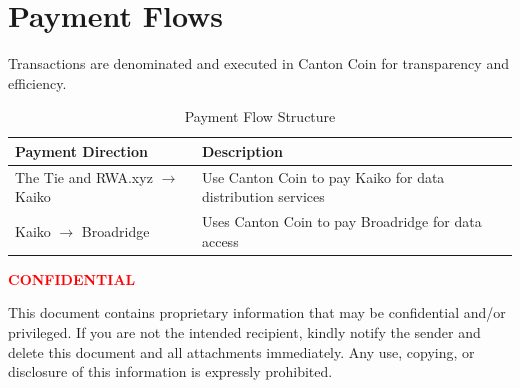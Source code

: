 \documentclass[11pt,a4paper]{article}
\begin{document}
\section{Payment Flows}

Transactions are denominated and executed in Canton Coin for transparency and efficiency.

\begin{table}[h!]
\centering
\caption{Payment Flow Structure}
\begin{tabular}{>{\raggedright\arraybackslash}p{} >{\raggedright\arraybackslash}p{}}
\toprule
\textbf{Payment Direction} & \textbf{Description} \\
\midrule
The Tie and RWA.xyz $\rightarrow$ Kaiko & Use Canton Coin to pay Kaiko for data distribution services \\
\addlinespace
Kaiko $\rightarrow$ Broadridge & Uses Canton Coin to pay Broadridge for data access \\
\bottomrule
\end{tabular}
\end{table}

\vfill

\begin{center}
\textcolor{red}{\textbf{CONFIDENTIAL}}
\end{center}

This document contains proprietary information that may be confidential and/or privileged. If you are not the intended recipient, kindly notify the sender and delete this document and all attachments immediately. Any use, copying, or disclosure of this information is expressly prohibited.
\end{document}
